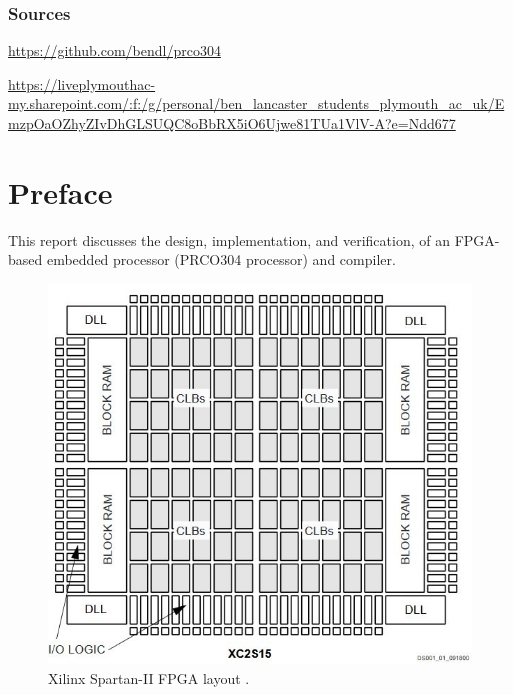 \documentclass[11pt,a4paper]{report}
\newcommand{\scname}{PRCO304}
\begin{document}
\subsection*{Sources}
\begin{description}[style=nextline]
\item[GitHub (with git repository metadata)]{\url{https://github.com/bendl/prco304}}
\item[OneDrive (raw files)]{\url{https://liveplymouthac-my.sharepoint.com/:f:/g/personal/ben_lancaster_students_plymouth_ac_uk/EmzpOaOZhyZIvDhGLSUQC8oBbRX5iO6Ujwe81TUa1VlV-A?e=Ndd677}}
\end{description}

\newpage
\chapter*{Preface}
This report discusses the design, implementation, and verification, of an FPGA-based embedded processor (\scname{} processor) and compiler.

\begin{figure}[H]
\begin{center}
\includegraphics[scale=0.4]{fpga}
\end{center}
\caption{Xilinx Spartan-II FPGA layout \citep{spartan2}.}
\label{fig:}
\end{figure}
\end{document}
